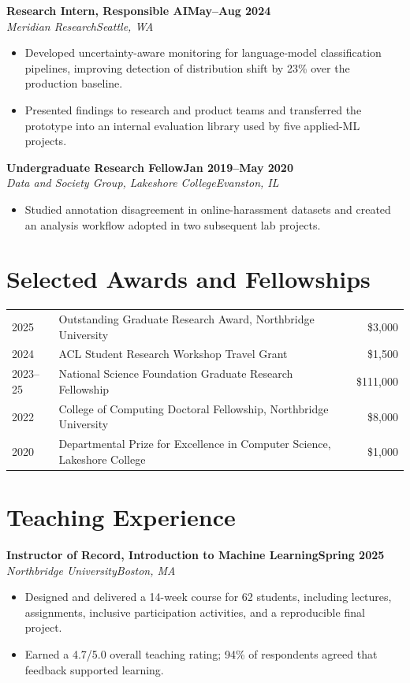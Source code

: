 \documentclass[10pt,letterpaper]{article}
\newcommand{\cventry}[4]{%
  \textbf{#1}\hfill\textbf{#2}\\[-1pt]
  \textit{#3}\hfill\textit{#4}\par
}
\begin{document}
\vspace{2pt}
\cventry{Research Intern, Responsible AI}{May--Aug 2024}{Meridian Research}{Seattle, WA}
\begin{itemize}
  \item Developed uncertainty-aware monitoring for language-model classification pipelines, improving
        detection of distribution shift by 23\% over the production baseline.
  \item Presented findings to research and product teams and transferred the prototype into an internal
        evaluation library used by five applied-ML projects.
\end{itemize}

\vspace{2pt}
\cventry{Undergraduate Research Fellow}{Jan 2019--May 2020}{Data and Society Group, Lakeshore College}{Evanston, IL}
\begin{itemize}
  \item Studied annotation disagreement in online-harassment datasets and created an analysis workflow
        adopted in two subsequent lab projects.
\end{itemize}

\section*{Selected Awards and Fellowships}
\begin{tabularx}{\textwidth}{@{}p{4.4em}Xr@{}}
2025 & Outstanding Graduate Research Award, Northbridge University & \$3,000\\
2024 & ACL Student Research Workshop Travel Grant & \$1,500\\
2023--25 & National Science Foundation Graduate Research Fellowship & \$111,000\\
2022 & College of Computing Doctoral Fellowship, Northbridge University & \$8,000\\
2020 & Departmental Prize for Excellence in Computer Science, Lakeshore College & \$1,000
\end{tabularx}

\section*{Teaching Experience}
\cventry{Instructor of Record, Introduction to Machine Learning}{Spring 2025}{Northbridge University}{Boston, MA}
\begin{itemize}
  \item Designed and delivered a 14-week course for 62 students, including lectures, assignments,
        inclusive participation activities, and a reproducible final project.
  \item Earned a 4.7/5.0 overall teaching rating; 94\% of respondents agreed that feedback supported learning.
\end{itemize}
\end{document}
